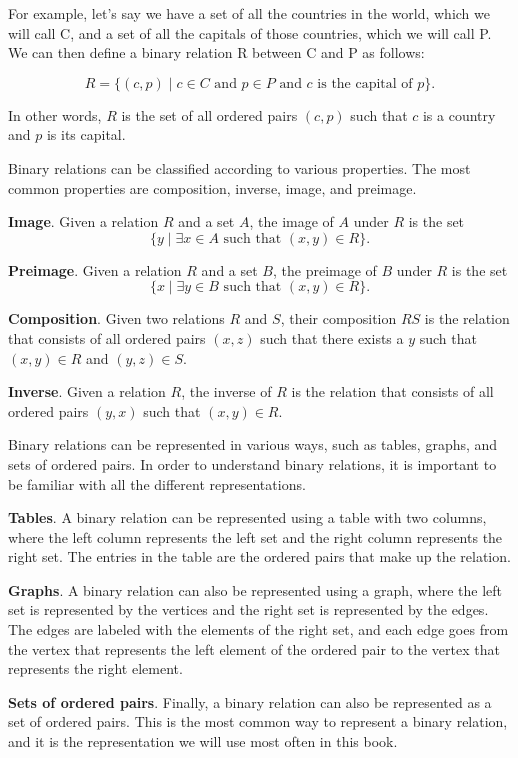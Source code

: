 \documentclass[
  letterpaper,
  10pt,
  reqno,
  twopage,
  openany]{book}
\theoremstyle{plain}
\theoremstyle{definition}
\theoremstyle{definition}
\theoremstyle{definition}
\theoremstyle{plain}
\theoremstyle{plain}
\theoremstyle{remark}
\begin{document}
For example, let's say we have a set of all the countries in the world,
which we will call C, and a set of all the capitals of those countries,
which we will call P. We can then define a binary relation R between C
and P as follows:

\[
R = \{(c,p) \mid c \in C \text{ and } p \in P \text{ and $c$ is the capital of $p$}\}.
\]

In other words, \(R\) is the set of all ordered pairs \((c,p)\) such
that \(c\) is a country and \(p\) is its capital.

Binary relations can be classified according to various properties. The
most common properties are composition, inverse, image, and preimage.

\textbf{Image}. Given a relation \(R\) and a set \(A\), the image of
\(A\) under \(R\) is the set \[
\{y \mid \exists x\in A \text{ such that } (x,y)\in R\}.
\]

\textbf{Preimage}. Given a relation \(R\) and a set \(B\), the preimage
of \(B\) under \(R\) is the set \[
\{x \mid \exists y\in B \text{ such that } (x,y)\in R\}.
\]

\textbf{Composition}. Given two relations \(R\) and \(S\), their
composition \(RS\) is the relation that consists of all ordered pairs
\((x,z)\) such that there exists a \(y\) such that \((x,y)\in R\) and
\((y,z)\in S\).

\textbf{Inverse}. Given a relation \(R\), the inverse of \(R\) is the
relation that consists of all ordered pairs \((y,x)\) such that
\((x,y)\in R\).

Binary relations can be represented in various ways, such as tables,
graphs, and sets of ordered pairs. In order to understand binary
relations, it is important to be familiar with all the different
representations.

\textbf{Tables}. A binary relation can be represented using a table with
two columns, where the left column represents the left set and the right
column represents the right set. The entries in the table are the
ordered pairs that make up the relation.

\textbf{Graphs}. A binary relation can also be represented using a
graph, where the left set is represented by the vertices and the right
set is represented by the edges. The edges are labeled with the elements
of the right set, and each edge goes from the vertex that represents the
left element of the ordered pair to the vertex that represents the right
element.

\textbf{Sets of ordered pairs}. Finally, a binary relation can also be
represented as a set of ordered pairs. This is the most common way to
represent a binary relation, and it is the representation we will use
most often in this book.
\end{document}
